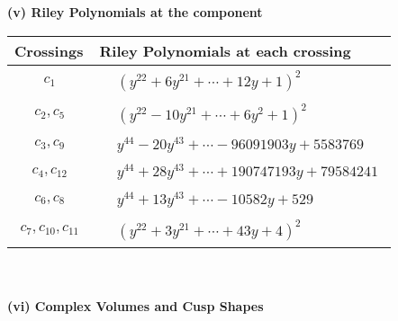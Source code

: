 \documentclass[1p]{elsarticle_modified}
\theoremstyle{definition}
\begin{document}
\newpage\renewcommand{\arraystretch}{1}
\flushleft \textbf{(v) Riley Polynomials at the component}\newline \\
\begin{tabular}{m{50pt}|m{274pt}}
Crossings & \hspace{64pt}Riley Polynomials at each crossing \\
\hline $$\begin{aligned}c_{1}\end{aligned}$$&$\begin{aligned}
&(y^{22}+6 y^{21}+\cdots+12 y+1)^{2}
\end{aligned}$\\
\hline $$\begin{aligned}c_{2},c_{5}\end{aligned}$$&$\begin{aligned}
&(y^{22}-10 y^{21}+\cdots+6 y^2+1)^{2}
\end{aligned}$\\
\hline $$\begin{aligned}c_{3},c_{9}\end{aligned}$$&$\begin{aligned}
&y^{44}-20 y^{43}+\cdots-96091903 y+5583769
\end{aligned}$\\
\hline $$\begin{aligned}c_{4},c_{12}\end{aligned}$$&$\begin{aligned}
&y^{44}+28 y^{43}+\cdots+190747193 y+79584241
\end{aligned}$\\
\hline $$\begin{aligned}c_{6},c_{8}\end{aligned}$$&$\begin{aligned}
&y^{44}+13 y^{43}+\cdots-10582 y+529
\end{aligned}$\\
\hline $$\begin{aligned}c_{7},c_{10},c_{11}\end{aligned}$$&$\begin{aligned}
&(y^{22}+3 y^{21}+\cdots+43 y+4)^{2}
\end{aligned}$\\
\hline
\end{tabular}\\~\\
\newpage\flushleft \textbf{(vi) Complex Volumes and Cusp Shapes}
\end{document}
